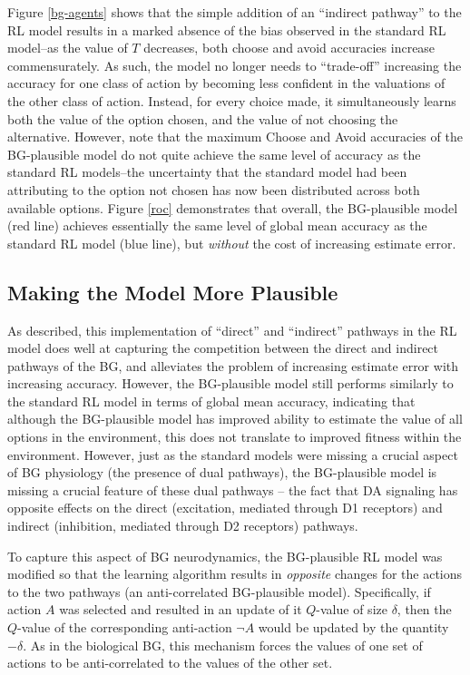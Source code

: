 \documentclass[10pt,letterpaper]{article}
\begin{document}
Figure \ref{bg-agents} shows that the simple addition of an ``indirect pathway'' to the RL model results in a marked absence of the bias observed in the standard RL model--as the value of $T$ decreases, both choose and avoid accuracies increase commensurately. As such, the model no longer needs to ``trade-off'' increasing the accuracy for one class of action by becoming less confident in the valuations of the other class of action. Instead, for every choice made, it simultaneously learns both the value of the option chosen, and the value of not choosing the alternative. However, note that the maximum Choose and Avoid accuracies of the BG-plausible model do not quite achieve the same level of accuracy as the standard RL models--the uncertainty that the standard model had been attributing to the option not chosen has now been distributed across both available options.  Figure \ref{roc} demonstrates that overall, the BG-plausible model (red line) achieves essentially the same level of global mean accuracy as the standard RL model (blue line), but \emph{without} the cost of increasing estimate error.  


\subsection{Making the Model More Plausible}

As described, this implementation of ``direct'' and ``indirect'' pathways in the RL model does well at capturing the competition between the direct and indirect pathways of the BG, and alleviates the problem of increasing estimate error with increasing accuracy. However, the BG-plausible model still performs similarly to the standard RL model in terms of global mean accuracy, indicating that although the BG-plausible model has improved ability to estimate the value of all options in the environment, this does not translate to improved fitness within the environment. However, just as the standard models were missing a crucial aspect of BG physiology (the presence of dual pathways), the BG-plausible model is missing a crucial feature of these dual pathways -- the fact that DA signaling has opposite effects on the direct (excitation, mediated through D1 receptors) and indirect (inhibition, mediated through D2 receptors) pathways. 

To capture this aspect of BG neurodynamics, the BG-plausible RL model was modified so that the learning algorithm results in \emph{opposite} changes for the actions to the two pathways (an anti-correlated BG-plausible model). Specifically, if action $A$ was selected and resulted in an update  of it $Q$-value of size $\delta$, then the $Q$-value of the corresponding anti-action $\neg A$ would be updated by the quantity $-\delta$. As in the biological BG, this mechanism forces the values of one set of actions to be anti-correlated to the values of the other set.
\end{document}
